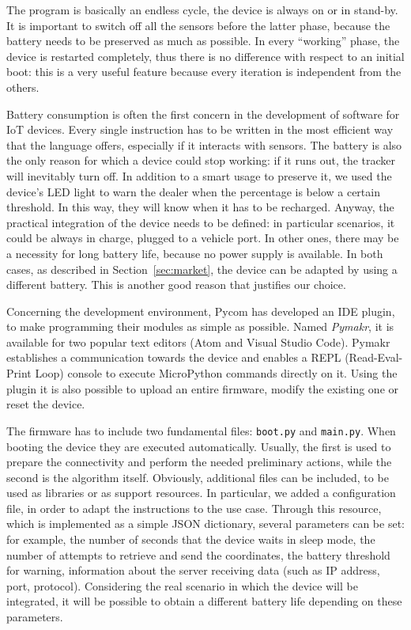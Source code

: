 The program is basically an endless cycle, the device is always on or in stand-by. It is important to switch off all the sensors before the latter phase, because the battery needs to be preserved as much as possible. In every ``working'' phase, the device is restarted completely, thus there is no difference with respect to an initial boot: this is a very useful feature because every iteration is independent from the others.

Battery consumption is often the first concern in the development of software for IoT devices. Every single instruction has to be written in the most efficient way that the language offers, especially if it interacts with sensors. The battery is also the only reason for which a device could stop working: if it runs out, the tracker will inevitably turn off. In addition to a smart usage to preserve it, we used the device's LED light to warn the dealer when the percentage is below a certain threshold. In this way, they will know when it has to be recharged. Anyway, the practical integration of the device needs to be defined: in particular scenarios, it could be always in charge, plugged to a vehicle port. In other ones, there may be a necessity for long battery life, because no power supply is available. In both cases, as described in Section~\ref{sec:market}, the device can be adapted by using a different battery. This is another good reason that justifies our choice.

Concerning the development environment, Pycom has developed an IDE plugin, to make programming their modules as simple as possible. Named \emph{Pymakr}, it is available for two popular text editors (Atom and Visual Studio Code). Pymakr establishes a communication towards the device and enables a REPL (Read-Eval-Print Loop) console to execute MicroPython commands directly on it. Using the plugin it is also possible to upload an entire firmware, modify the existing one or reset the device.

The firmware has to include two fundamental files: \texttt{boot.py} and \texttt{main.py}. When booting the device they are executed automatically. Usually, the first is used to prepare the connectivity and perform the needed preliminary actions, while the second is the algorithm itself. Obviously, additional files can be included, to be used as libraries or as support resources. In particular, we added a configuration file, in order to adapt the instructions to the use case. Through this resource, which is implemented as a simple JSON dictionary, several parameters can be set: for example, the number of seconds that the device waits in sleep mode, the number of attempts to retrieve and send the coordinates, the battery threshold for warning, information about the server receiving data (such as IP address, port, protocol). Considering the real scenario in which the device will be integrated, it will be possible to obtain a different battery life depending on these parameters.

